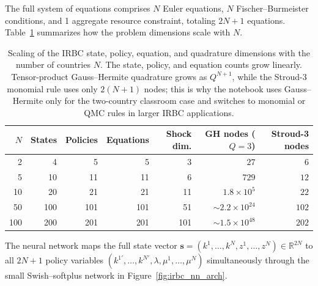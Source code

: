 \documentclass[11pt,a4paper]{report}
\newcommand{\R}{\mathbb{R}}
\begin{document}
The full system of equations comprises $N$ Euler equations, $N$ Fischer--Burmeister conditions, and 1 aggregate resource constraint, totaling $2N+1$ equations.  Table~\ref{tab:irbc_scalability} summarizes how the problem dimensions scale with $N$.

\begin{table}[ht]
\centering
\scriptsize
\begin{tabular}{@{}r r r r r r r@{}}
\toprule
$N$ & States & Policies & Equations & Shock dim. & GH nodes ($Q=3$) & Stroud-3 nodes \\
\midrule
2 & 4 & 5 & 5 & 3 & $27$ & $6$ \\
5 & 10 & 11 & 11 & 6 & $729$ & $12$ \\
10 & 20 & 21 & 21 & 11 & $1.8\times 10^5$ & $22$ \\
50 & 100 & 101 & 101 & 51 & $\sim 2.2\times 10^{24}$ & $102$ \\
100 & 200 & 201 & 201 & 101 & $\sim 1.5\times 10^{48}$ & $202$ \\
\bottomrule
\end{tabular}
\caption{Scaling of the IRBC state, policy, equation, and quadrature dimensions with the number of countries $N$.  The state, policy, and equation counts grow linearly.  Tensor-product Gauss--Hermite quadrature grows as $Q^{N+1}$, while the Stroud-3 monomial rule uses only $2(N+1)$ nodes; this is why the notebook uses Gauss--Hermite only for the two-country classroom case and switches to monomial or QMC rules in larger IRBC applications.}
\label{tab:irbc_scalability}
\end{table}

The neural network maps the full state vector $\bm{s} = (k^1,\ldots,k^N, z^1,\ldots,z^N) \in \R^{2N}$ to all $2N+1$ policy variables $(k^{1\prime},\ldots,k^{N\prime}, \lambda, \mu^1,\ldots,\mu^N)$ simultaneously through the small Swish--softplus network in Figure~\ref{fig:irbc_nn_arch}.
\end{document}
